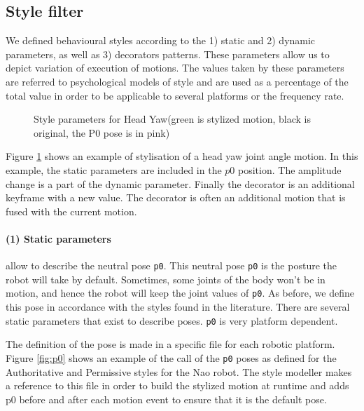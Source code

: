 \documentclass[smallextended]{svjour3}
\begin{document}

\subsection{Style filter}
\label{ssec:bss}
We defined behavioural styles according to the 1) static and 2) dynamic parameters, as well as 3) decorators patterns. 
These parameters allow us to depict variation of execution of motions.
The values taken by these parameters are referred to psychological models of style and are used as a percentage of the total value in order to be applicable to several platforms or the frequency rate.
\begin{figure}
	\centering
	\caption{Style parameters for Head Yaw(green is stylized motion, black is original, the P0 pose is in pink)}
	\label{fig:styles_parameters}
\end{figure}

Figure \ref{fig:styles_parameters} shows an example of stylisation of a head yaw joint angle motion.
In this example, the static parameters are included in the $p0$ position.
The amplitude change is a part of the dynamic parameter. 
Finally the decorator is an additional keyframe with a new value. 
The decorator is often an additional motion that is fused with the current motion.

\paragraph{(1) Static parameters} allow to describe the neutral pose \texttt{p0}. 
This neutral pose \texttt{p0} is the posture the robot will take by default.
Sometimes, some joints of the body won't be in motion,  and hence the robot will keep the joint values of \texttt{p0}.
As before, we define this pose in accordance with the styles found in the literature. 
There are several static parameters that exist to describe poses. 
\texttt{p0} is very platform dependent. 

The definition of the pose is made in a specific file for each robotic platform.
Figure \ref{fig:p0} shows an example of the call of the \texttt{p0} poses as defined for the Authoritative and Permissive styles for the Nao robot. 
The style modeller makes a reference to this file in order to build the stylized motion at runtime and adds p0 before and after each motion event to ensure that it is the default pose.
\end{document}
